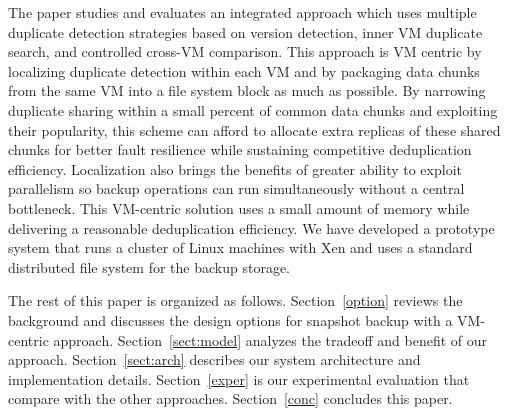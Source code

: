 The paper studies and evaluates  an integrated approach which uses  multiple duplicate detection strategies
based on  version  detection, inner VM duplicate search,
and controlled cross-VM comparison. 
This approach is VM centric by localizing duplicate detection within each VM  
and by packaging data chunks from the same VM into a file system block as much as possible.
By narrowing duplicate sharing within a small percent of common data chunks and exploiting their popularity,
this scheme can afford to allocate extra replicas of these shared chunks for better
fault resilience while sustaining competitive deduplication efficiency.
Localization also brings the benefits of greater ability to exploit parallelism so
backup operations can run simultaneously without a central  bottleneck.
This  VM-centric solution uses  a small amount of  memory while delivering a reasonable deduplication efficiency. 
We have developed a prototype system that runs a cluster of Linux machines with Xen and uses 
a standard distributed file system for the backup storage. 



The rest of this paper is organized as follows.
Section~\ref{option} reviews the background and discusses the  design options for snapshot backup 
with a VM-centric approach. 
Section~\ref{sect:model}  analyzes the tradeoff and benefit of our approach. 
Section~\ref{sect:arch}  describes our system architecture and implementation details.
Section~\ref{exper} is our experimental evaluation that compare with the other approaches.
Section~\ref{conc}  concludes this paper.


